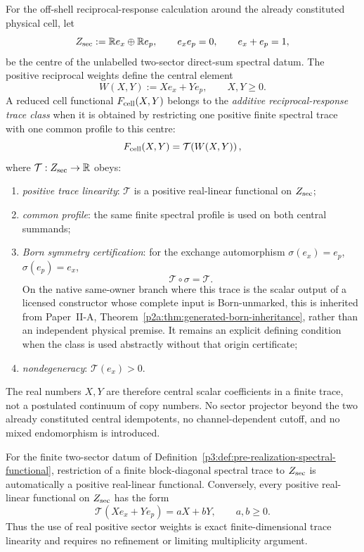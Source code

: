 \documentclass[12pt,a4paper]{article}
\begin{document}
\begin{definition}
\label{p3:def:pre-realization-spectral-functional}
For the off-shell reciprocal-response calculation around the already constituted physical cell, let
\[
        Z_{\rm sec}:=\mathbb{R} e_x\oplus\mathbb{R} e_p,
        \qquad
        e_xe_p=0,
        \qquad
        e_x+e_p=1,
\]
be the centre of the unlabelled two-sector direct-sum spectral datum.  The
positive reciprocal weights define the central element
\[
        W(X,Y):=Xe_x+Ye_p,
        \qquad X,Y\ge0.
\]
A reduced cell functional \(F_{\rm cell}(X,Y)\) belongs to the
\emph{additive reciprocal-response trace class} when it is obtained by restricting one
positive finite spectral trace with one common profile to this centre:
\[
        F_{\rm cell}(X,Y)
        =\mathcal T\!\left(W(X,Y)\right),
\]
where \(\mathcal T:Z_{\rm sec}\to\mathbb{R}\) obeys:
\begin{enumerate}[label=(\roman*),leftmargin=2.1em]
\item \emph{positive trace linearity}: \(\mathcal T\) is a positive real-linear
      functional on \(Z_{\rm sec}\);
\item \emph{common profile}: the same finite spectral profile is used on both
      central summands;
\item \emph{Born symmetry certification}: for the exchange automorphism
      \(\sigma(e_x)=e_p\), \(\sigma(e_p)=e_x\),
\[
        \mathcal T\circ\sigma=\mathcal T.
\]
      On the native same-owner branch where this trace is the scalar output of
      a licensed constructor whose complete input is Born-unmarked, this is
      inherited from Paper~II-A,
      Theorem~\ref{p2a:thm:generated-born-inheritance}, rather than an
      independent physical premise.  It remains an explicit defining
      condition when the class is used abstractly without that origin
      certificate;
\item \emph{nondegeneracy}: \(\mathcal T(e_x)>0\).
\end{enumerate}
The real numbers \(X,Y\) are therefore central scalar coefficients in a finite
trace, not a postulated continuum of copy numbers.  No sector projector beyond
the two already constituted central idempotents, no channel-dependent cutoff,
and no mixed endomorphism is introduced.
\end{definition}

\begin{lemma}
\label{p3:lem:finite-trace-real-weights}
For the finite two-sector datum of
Definition~\ref{p3:def:pre-realization-spectral-functional}, restriction of a
finite block-diagonal spectral trace to \(Z_{\rm sec}\) is automatically a
positive real-linear functional.  Conversely, every positive real-linear
functional on \(Z_{\rm sec}\) has the form
\[
        \mathcal T(Xe_x+Ye_p)=aX+bY,
        \qquad a,b\ge0.
\]
Thus the use of real positive sector weights is exact finite-dimensional trace
linearity and requires no refinement or limiting multiplicity argument.
\end{lemma}
\end{document}
